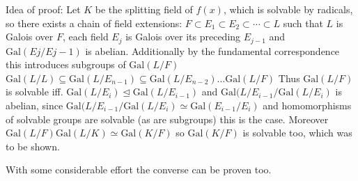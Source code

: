 Idea of proof:
Let \(K\) be the splitting field of \( f(x) \), which is solvable by radicals, so there exists a chain of field extensions:
\(
F \subset E_1 \subset E_2 \subset \cdots \subset L
\)
such that \(L\) is Galois over \(F\), each field \(E_j\) is Galois over its preceding \(E_{j−1}\)
and \(\text{Gal}(Ej/Ej−1)\) is abelian.
Additionally by the fundamental correspondence this introduces subgroups of \(\text{Gal}(L/F)\)
\(
\text{Gal}(L/L) \subseteq \text{Gal}(L/E_{n-1}) \subseteq \text{Gal}(L/E_{n-2}) \dots \text{Gal}(L/F)
\)
Thus \(\text{Gal}(L/F)\) is solvable iff. \(\text{Gal}(L/E_{i}) \unlhd \text{Gal}(L/E_{i-1})\) and \(\text{Gal}(L/E_{i-1}/\text{Gal}(L/E_{i})\)
is abelian, since \(\text{Gal}(L/E_{i-1}/\text{Gal}(L/E_{i}) \simeq \text{Gal}(E_{i-1}/E_{i})\) and homomorphisms of solvable groups are solvable
(as are subgroups) this is the case. Moreover \(\text{Gal}(L/F)\text{Gal}(L/K) \simeq \text{Gal}(K/F)\) so \(\text{Gal}(K/F)\) is solvable too,
which was to be shown.

With some considerable effort the converse can be proven too.
